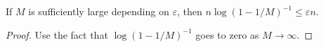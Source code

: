 \begin{sublemma}
\label{bound-score-1}
\leanok
If $M$ is sufficiently large depending on $\varepsilon$, then
$n \log(1-1/M)^{-1} \leq \varepsilon n$.
\end{sublemma}
\begin{proof}
\leanok
Use the fact that $\log(1-1/M)^{-1}$ goes to zero as $M \to \infty$.
\end{proof}

